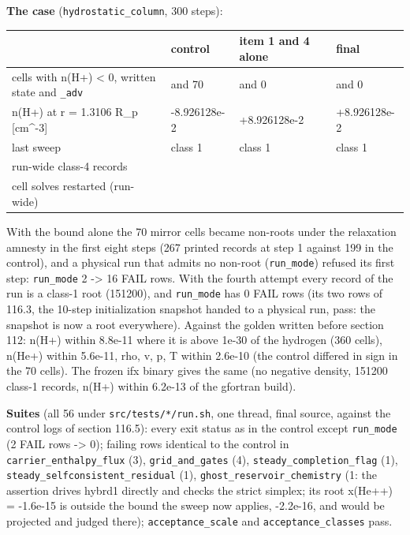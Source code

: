 \documentclass[english,a4paper]{my_memo}
\begin{document}
\textbf{The case} (\texttt{hydrostatic\_column}, 300 steps):

{\def\LTcaptype{none} %
{\small
\begin{longtable}[]{@{}>{\raggedright\arraybackslash}p{\dimexpr(\linewidth-8\tabcolsep)/4\relax}>{\raggedright\arraybackslash}p{\dimexpr(\linewidth-8\tabcolsep)/4\relax}>{\raggedright\arraybackslash}p{\dimexpr(\linewidth-8\tabcolsep)/4\relax}>{\raggedright\arraybackslash}p{\dimexpr(\linewidth-8\tabcolsep)/4\relax}@{}}
\toprule\noalign{}
& control & item 1 and 4 alone & final \\
\midrule\noalign{}
\endhead
\bottomrule\noalign{}
\endlastfoot
cells with n(H+) \textless{} 0, written state and \texttt{\_adv} & 70 and 70 & 0 and 0 & 0 and 0 \\
n(H+) at r = 1.3106 R\_p {[}cm\^{}-3{]} & -8.926128e-2 & +8.926128e-2 & +8.926128e-2 \\
last sweep & 504 class 1 & 504 class 1 & 504 class 1 \\
run-wide class-4 records & 2695 & 3266 & 0 \\
cell solves restarted (run-wide) & 3043 & 3795 & 1032 \\
\end{longtable}
}
}

With the bound alone the 70 mirror cells became non-roots under the
relaxation amnesty in the first eight steps (267 printed records at step 1
against 199 in the control), and a physical run that admits no non-root
(\texttt{run\_mode}) refused its first step: \texttt{run\_mode} 2 -\textgreater{} 16 FAIL rows. With the
fourth attempt every record of the run is a class-1 root (151200), and
\texttt{run\_mode} has 0 FAIL rows (its two rows of 116.3, the 10-step
initialization snapshot handed to a physical run, pass: the snapshot is now
a root everywhere). Against the golden written before section 112: n(H+)
within 8.8e-11 where it is above 1e-30 of the hydrogen (360 cells), n(He+)
within 5.6e-11, rho, v, p, T within 2.6e-10 (the control differed in sign
in the 70 cells). The frozen ifx binary gives the same (no negative density,
151200 class-1 records, n(H+) within 6.2e-13 of the gfortran build).

\textbf{Suites} (all 56 under \texttt{src/tests/*/run.sh}, one thread, final source,
against the control logs of section 116.5): every exit status as in the
control except \texttt{run\_mode} (2 FAIL rows -\textgreater{} 0); failing rows identical to the
control in \texttt{carrier\_enthalpy\_flux} (3), \texttt{grid\_and\_gates} (4),
\texttt{steady\_completion\_flag} (1), \texttt{steady\_selfconsistent\_residual} (1),
\texttt{ghost\_reservoir\_chemistry} (1: the assertion drives hybrd1 directly and
checks the strict simplex; its root x(He++) = -1.6e-15 is outside the bound
the sweep now applies, -2.2e-16, and would be projected and judged there);
\texttt{acceptance\_scale} and \texttt{acceptance\_classes} pass.
\end{document}
